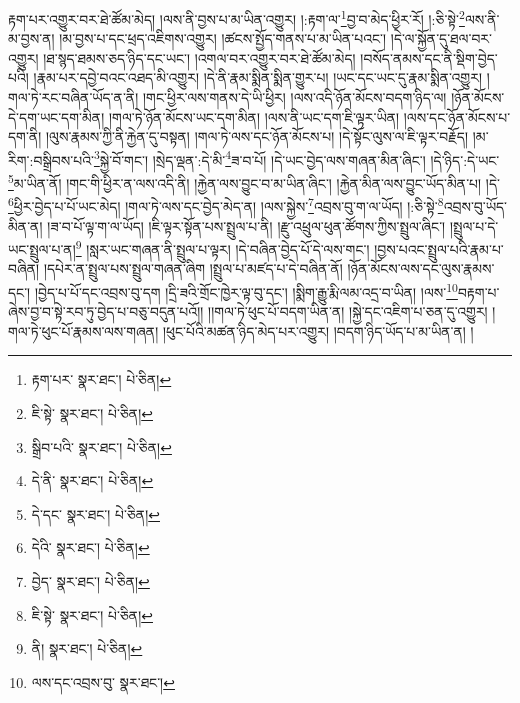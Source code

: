 རྟག་པར་འགྱུར་བར་ཐེ་ཚོམ་མེད། །ལས་ནི་བྱས་པ་མ་ཡིན་འགྱུར། །:རྟག་ལ་\footnote{རྟག་པར་  སྣར་ཐང་།  པེ་ཅིན། }བྱ་བ་མེད་ཕྱིར་རོ། །:ཅི་སྟེ་\footnote{ཇི་སྟེ་  སྣར་ཐང་།  པེ་ཅིན། }ལས་ནི་མ་བྱས་ན། །མ་བྱས་པ་དང་ཕྲད་འཇིགས་འགྱུར། །ཚངས་སྤྱོད་གནས་པ་མ་ཡིན་པའང་། །དེ་ལ་སྐྱོན་དུ་ཐལ་བར་འགྱུར། །ཐ་སྙད་ཐམས་ཅད་ཉིད་དང་ཡང་། །འགལ་བར་འགྱུར་བར་ཐེ་ཚོམ་མེད། །བསོད་ནམས་དང་ནི་སྡིག་བྱེད་པའི། །རྣམ་པར་དབྱེ་བའང་འཐད་མི་འགྱུར། །དེ་ནི་རྣམ་སྨིན་སྨིན་གྱུར་པ། །ཡང་དང་ཡང་དུ་རྣམ་སྨིན་འགྱུར། །གལ་ཏེ་རང་བཞིན་ཡོད་ན་ནི། །གང་ཕྱིར་ལས་གནས་དེ་ཡི་ཕྱིར། །ལས་འདི་ཉོན་མོངས་བདག་ཉིད་ལ། །ཉོན་མོངས་དེ་དག་ཡང་དག་མིན། །གལ་ཏེ་ཉོན་མོངས་ཡང་དག་མིན། །ལས་ནི་ཡང་དག་ཇི་ལྟར་ཡིན། །ལས་དང་ཉོན་མོངས་པ་དག་ནི། །ལུས་རྣམས་ཀྱི་ནི་རྐྱེན་དུ་བསྟན། །གལ་ཏེ་ལས་དང་ཉོན་མོངས་པ། །དེ་སྟོང་ལུས་ལ་ཇི་ལྟར་བརྗོད། །མ་རིག་:བསྒྲིབས་པའི་\footnote{སྒྲིབ་པའི་  སྣར་ཐང་།  པེ་ཅིན། }སྐྱེ་བོ་གང་། །སྲེད་ལྡན་:དེ་མི་\footnote{དེ་ནི་  སྣར་ཐང་།  པེ་ཅིན། }ཟ་བ་པོ། །དེ་ཡང་བྱེད་ལས་གཞན་མིན་ཞིང་། །དེ་ཉིད་:དེ་ཡང་\footnote{དེ་དང་  སྣར་ཐང་།  པེ་ཅིན། }མ་ཡིན་ནོ། །གང་གི་ཕྱིར་ན་ལས་འདི་ནི། །རྐྱེན་ལས་བྱུང་བ་མ་ཡིན་ཞིང་། །རྐྱེན་མིན་ལས་བྱུང་ཡོད་མིན་པ། །དེ་\footnote{དེའི་  སྣར་ཐང་།  པེ་ཅིན། }ཕྱིར་བྱེད་པ་པོ་ཡང་མེད། །གལ་ཏེ་ལས་དང་བྱེད་མེད་ན། །ལས་སྐྱེས་\footnote{བྱེད་  སྣར་ཐང་།  པེ་ཅིན། }འབྲས་བུ་ག་ལ་ཡོད། །:ཅི་སྟེ་\footnote{ཇི་སྟེ་  སྣར་ཐང་།  པེ་ཅིན། }འབྲས་བུ་ཡོད་མིན་ན། །ཟ་བ་པོ་ལྟ་ག་ལ་ཡོད། །ཇི་ལྟར་སྟོན་པས་སྤྲུལ་པ་ནི། །རྫུ་འཕྲུལ་ཕུན་ཚོགས་ཀྱིས་སྤྲུལ་ཞིང་། །སྤྲུལ་པ་དེ་ཡང་སྤྲུལ་པ་ན།\footnote{ནི།  སྣར་ཐང་།  པེ་ཅིན། } །སླར་ཡང་གཞན་ནི་སྤྲུལ་པ་ལྟར། །དེ་བཞིན་བྱེད་པོ་དེ་ལས་གང་། །བྱས་པའང་སྤྲུལ་པའི་རྣམ་པ་བཞིན། །དཔེར་ན་སྤྲུལ་པས་སྤྲུལ་གཞན་ཞིག །སྤྲུལ་པ་མཛད་པ་དེ་བཞིན་ནོ། །ཉོན་མོངས་ལས་དང་ལུས་རྣམས་དང་། །བྱེད་པ་པོ་དང་འབྲས་བུ་དག །དྲི་ཟའི་གྲོང་ཁྱེར་ལྟ་བུ་དང་། །སྨིག་རྒྱུ་རྨི་ལམ་འདྲ་བ་ཡིན། །ལས་\footnote{ལས་དང་འབྲས་བུ་  སྣར་ཐང་། }བརྟག་པ་ཞེས་བྱ་བ་སྟེ་རབ་ཏུ་བྱེད་པ་བཅུ་བདུན་པའོ།། །།གལ་ཏེ་ཕུང་པོ་བདག་ཡིན་ན། །སྐྱེ་དང་འཇིག་པ་ཅན་དུ་འགྱུར། །གལ་ཏེ་ཕུང་པོ་རྣམས་ལས་གཞན། །ཕུང་པོའི་མཚན་ཉིད་མེད་པར་འགྱུར། །བདག་ཉིད་ཡོད་པ་མ་ཡིན་ན། །
